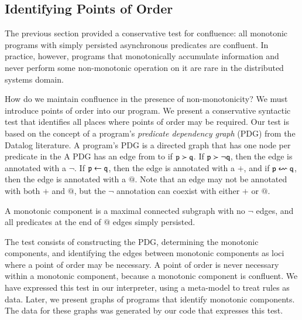 \subsection{Identifying Points of Order}
The previous section provided a conservative test for confluence: all monotonic
programs with simply persisted asynchronous predicates are confluent.  In
practice, however, programs that monotonically accumulate information and never
perform some non-monotonic operation on it are rare in the distributed systems
domain.


How do we maintain confluence in the presence of non-monotonicity?  We must
introduce points of order into our program.  We present a conservative
syntactic test that identifies all places where points of order may be
required.  Our test is based on the concept of a program's {\em predicate
dependency graph} (PDG) from the Datalog literature.  A \lang program's PDG is
a directed graph that has one node per predicate in the A PDG has an edge from
 to  if $\dedalus{p} \succ \dedalus{q}$.  If $\dedalus{p}
\succ \lnot\dedalus{q}$, then the edge is annotated with a $\lnot$.  If
$\dedalus{p} \gets \dedalus{q}$, then the edge is annotated with a $+$, and if
$\dedalus{p} \leftsquigarrow \dedalus{q}$, then the edge is annotated with a
$@$.  Note that an edge may not be annotated with both $+$ and $@$, but the
$\lnot$ annotation can coexist with either $+$ or $@$.

\begin{definition}
%
A monotonic component is a maximal connected subgraph with no $\lnot$ edges,
and all predicates at the end of $@$ edges simply persisted.
%
\end{definition}

The test consists of constructing the PDG, determining the monotonic
components, and identifying the edges between monotonic components as loci
where a point of order may be necessary.  A point of order is never necessary
within a monotonic component, because a monotonic component is confluent.
We have expressed this test in our \lang 
interpreter, using a meta-model to treat rules as data.  Later, we present graphs of programs that
identify monotonic components.  The data for these graphs was generated by our
\lang code that expresses this test.
